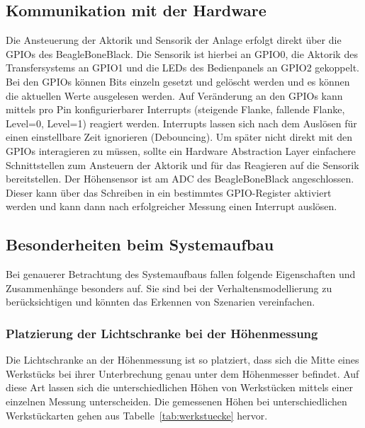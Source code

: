 \subsection{Kommunikation mit der Hardware}

Die Ansteuerung der Aktorik und Sensorik der Anlage erfolgt direkt über die GPIOs des BeagleBoneBlack.
Die Sensorik ist hierbei an GPIO0, die Aktorik des Transfersystems an GPIO1 und die LEDs des Bedienpanels an GPIO2
gekoppelt.
Bei den GPIOs können Bits einzeln gesetzt und gelöscht werden und es können die aktuellen Werte ausgelesen werden.
Auf Veränderung an den GPIOs kann mittels pro Pin konfigurierbarer Interrupts (steigende Flanke, fallende Flanke,
Level=0, Level=1) reagiert werden.
Interrupts lassen sich nach dem Auslösen für einen einstellbare Zeit ignorieren (Debouncing).
Um später nicht direkt mit den GPIOs interagieren zu müssen, sollte ein Hardware Abstraction Layer
einfachere Schnittstellen zum Ansteuern der Aktorik und für das Reagieren auf die Sensorik bereitstellen.
Der Höhensensor ist am ADC des BeagleBoneBlack angeschlossen. Dieser kann über das Schreiben in ein
bestimmtes GPIO-Register aktiviert werden und kann dann nach erfolgreicher Messung einen Interrupt auslösen.

\subsection{Besonderheiten beim Systemaufbau}

Bei genauerer Betrachtung des Systemaufbaus fallen folgende Eigenschaften und Zusammenhänge besonders auf.
Sie sind bei der Verhaltensmodellierung zu berücksichtigen und könnten das Erkennen von Szenarien vereinfachen.

\subsubsection{Platzierung der Lichtschranke bei der Höhenmessung}

Die Lichtschranke an der Höhenmessung ist so platziert, dass sich die Mitte eines Werkstücks bei ihrer
Unterbrechung genau unter dem Höhenmesser befindet.
Auf diese Art lassen sich die unterschiedlichen Höhen von Werkstücken mittels einer einzelnen Messung unterscheiden.
Die gemessenen Höhen bei unterschiedlichen Werkstückarten gehen aus Tabelle~\ref{tab:werkstuecke} hervor.

